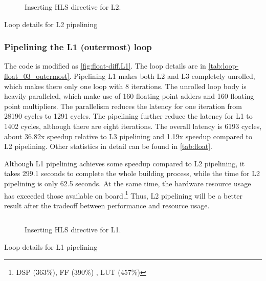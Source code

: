 \begin{figure}[h!]
    \centering
    \inputminted{diff}{program/diff.L2}
    \caption{Inserting HLS directive for L2.}\label{fig:float-diff.L2}
\end{figure}

\begin{table}[h!]
    \caption{Loop details for L2 pipelining}
    \label{tab:loop-float_04_L2}
    \centering
    
\end{table}

\subsubsection{Pipelining the L1 (outermost) loop}\label{sec:1bL1}

The code is modified as \autoref{fig:float-diff.L1}.
The loop details are in \autoref{tab:loop-float_03_outermost}.
Pipelining L1 makes both L2 and L3 completely unrolled, which makes there only one loop with 8 iterations.
The unrolled loop body is heavily paralleled, which make use of 160 floating point adders and 160 floating point multipliers.
The parallelism reduces the latency for one iteration from 28190 cycles to 1291 cycles.
The pipelining further reduce the latency for L1 to 1402 cycles, although there are eight iterations.
The overall latency is 6193 cycles, about 36.82x speedup relative to L3 pipelining and 1.19x speedup compared to L2 pipelining.
Other statistics in detail can be found in \autoref{tab:float}.

Although L1 pipelining achieves some speedup compared to L2 pipelining, it takes 299.1 seconds to complete the whole building process, while the time for L2 pipelining is only 62.5 seconds.
At the same time, the hardware resource usage has exceeded those available on board.\footnote{
    DSP (363\%), FF (390\%) , LUT (457\%)
}
Thus, L2 pipelining will be a better result after the tradeoff between performance and resource usage.

\begin{figure}[h!]
    \centering
    \inputminted{diff}{program/diff.L1}
    \caption{Inserting HLS directive for L1.}\label{fig:float-diff.L1}
\end{figure}

\begin{table}[h!]
    \caption{Loop details for L1 pipelining}
    \label{tab:loop-float_03_outermost}
    \centering
    
\end{table}

